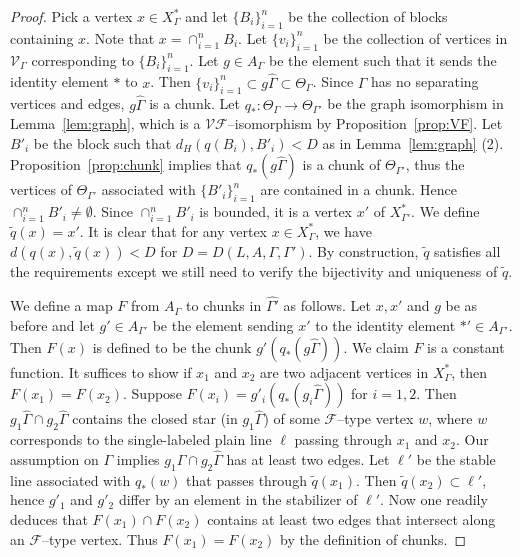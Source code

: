 \documentclass[11pt]{amsart}
\newcommand {\V}{\mathcal V}
\newcommand {\F}{\mathcal F}
\theoremstyle{definition}
\newcommand{\Xa}{X^{\ast}}
\begin{document}
\begin{proof}
Pick a vertex $x\in\Xa_\Gamma$ and let $\{B_i\}_{i=1}^{n}$ be the collection of blocks containing $x$. Note that $x=\cap_{i=1}^{n} B_i$. Let $\{v_i\}_{i=1}^n$ be the collection of vertices in $\V_\Gamma$ corresponding to $\{B_i\}_{i=1}^{n}$. Let $g\in A_\Gamma$ be the element such that it sends the identity element $\ast$ to $x$. Then $\{v_i\}_{i=1}^n\subset g\widehat\Gamma\subset \Theta_\Gamma$. Since $\Gamma$ has no separating vertices and edges, $g\widehat \Gamma$ is a chunk. Let $q_\ast\colon \Theta_\Gamma\to\Theta_{\Gamma'}$ be the graph isomorphism in Lemma~\ref{lem:graph}, which is a $\V\F$--isomorphism by Proposition~\ref{prop:VF}. Let $B'_i$ be the block such that $d_H(q(B_i),B'_i)<D$ as in Lemma~\ref{lem:graph} (2). Proposition~\ref{prop:chunk} implies that $q_\ast(g\widehat\Gamma)$ is a chunk of $\Theta_{\Gamma'}$, thus the vertices of $\Theta_{\Gamma'}$ associated with $\{B'_i\}_{i=1}^n$ are contained in a chunk. Hence $\cap_{i=1}^{n} B'_i\neq\emptyset$. Since $\cap_{i=1}^{n} B'_i$ is bounded, it is a vertex $x'$ of $\Xa_{\Gamma'}$. We define $\tilde q(x)=x'$. It is clear that for any vertex $x\in \Xa_\Gamma$, we have $d(q(x),\tilde q(x))<D$ for $D=D(L,A,\Gamma,\Gamma')$. By construction, $\tilde q$ satisfies all the requirements except we still need to verify the bijectivity and uniqueness of $\tilde q$.

We define a map $F$ from $A_\Gamma$ to chunks in $\widehat{\Gamma'}$ as follows. Let $x,x'$ and $g$ be as before and let $g'\in A_{\Gamma'}$ be the element sending $x'$ to the identity element $\ast'\in A_{\Gamma'}$. Then $F(x)$ is defined to be the chunk $g'(q_\ast(g\widehat\Gamma))$. We claim $F$ is a constant function. It suffices to show if $x_1$ and $x_2$ are two adjacent vertices in $\Xa_\Gamma$, then $F(x_1)=F(x_2)$. Suppose $F(x_i)=g'_i(q_\ast(g_i\widehat\Gamma))$ for $i=1,2$. Then $g_1\widehat\Gamma\cap g_2\widehat\Gamma$ contains the closed star (in $g_1\widehat\Gamma$) of some $\F$--type vertex $w$, where $w$ corresponds to the single-labeled plain line $\ell$ passing through $x_1$ and $x_2$. Our assumption on $\Gamma$ implies $g_1\widehat\Gamma\cap g_2\widehat\Gamma$ has at least two edges. Let $\ell'$ be the stable line associated with $q_\ast(w)$ that passes through $\tilde q(x_1)$. Then $\tilde q(x_2)\subset \ell'$, hence $g'_1$ and $g'_2$ differ by an element in the stabilizer of $\ell'$. Now one readily deduces that $F(x_1)\cap F(x_2)$ contains at least two edges that intersect along an $\F$--type vertex. Thus $F(x_1)=F(x_2)$ by the definition of chunks.


\end{proof}
\end{document}
